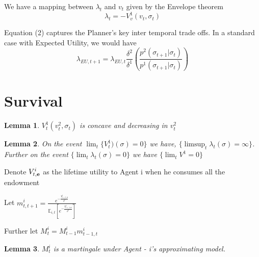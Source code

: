 \documentclass[12pt]{article}
\newtheorem{lemma}{Lemma}
\begin{document}
\noindent We have a mapping between $\lambda_t$ and $v_t$ given by the Envelope theorem
\[\lambda_t=-V^1_v(v_t,\sigma_t)\]

\noindent Equation (2) captures the Planner's key inter temporal trade offs. In a standard case with Expected Utility, we would have 
\[\lambda_{EU,t+1}=\lambda_{EU,t}\frac{\delta^2}{\delta^1}\left(\frac{p^2(\sigma_{t+1}|\sigma_t)}{p^1(\sigma_{t+1}|\sigma_t)}\right)\]
%
%
\section{Survival}
\begin{lemma}
$V^1_t(v^2_t,\sigma_t)$ is concave and decreasing in $v^2_t$
\end{lemma}

\begin{lemma}
On the event $\lim_t \{V^1_t)(\sigma) = 0\}$ we have, $\{\limsup_t \lambda_{t}(\sigma)=\infty\}$. Further on the event $\{\lim_t \lambda_t(\sigma)=0\}$ we have $\{\lim_t V^1 =0\}$
\end{lemma}


Denote $V^i_{t,\text{\textbf{e}}}$ as the lifetime utility to Agent i when he consumes all the endowment

Let $m^i_{t,t+1}=\frac{e^{-\frac{V^i_{t+1,\textbf{e}}}{\theta^i}}}{\mathbb{E}_{i,t}\left[ e^{-\frac{V^i_{t+1,\textbf{e}}}{\theta^1}}\right]   }$

Further let $M^i_t=M^i_{t-1}m^i_{t-1,t}$

\begin{lemma} $M^i_t$ is a martingale under Agent - i's approximating model. 
\end{lemma}
\end{document}
